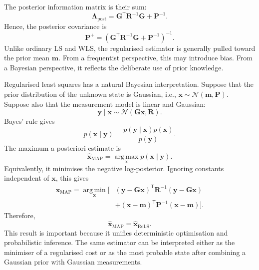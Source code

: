 The posterior information matrix is their sum:
\begin{equation}
\mathbf{\Lambda}_{\mathrm{post}}
=
\mathbf{G}^{\mathsf T}
\mathbf{R}^{-1}
\mathbf{G}
+
\mathbf{P}^{-1}.
\end{equation}
Hence, the posterior covariance is
\begin{equation}
\mathbf{P}^{+}
=
\left(
\mathbf{G}^{\mathsf T}
\mathbf{R}^{-1}
\mathbf{G}
+
\mathbf{P}^{-1}
\right)^{-1}.
\end{equation}
Unlike ordinary LS and WLS, the regularised estimator is generally pulled toward the prior mean $\mathbf{m}$. From a frequentist perspective, this may introduce bias. From a Bayesian perspective, it reflects the deliberate use of prior knowledge.

Regularised least squares has a natural Bayesian interpretation. Suppose that the prior distribution of the unknown state is Gaussian, i.e., $\mathbf{x}
\sim
\mathcal{N}
\left(
\mathbf{m},
\mathbf{P}
\right)$. Suppose also that the measurement model is linear and Gaussian:
\begin{equation}
\mathbf{y}\mid\mathbf{x}
\sim
\mathcal{N}
\left(
\mathbf{G}\mathbf{x},
\mathbf{R}
\right).
\end{equation}
Bayes' rule gives
\begin{equation}
p(\mathbf{x}\mid\mathbf{y})
=
\frac{
p(\mathbf{y}\mid\mathbf{x})p(\mathbf{x})
}{
p(\mathbf{y})
}.
\end{equation}
The maximum a posteriori estimate is
\begin{equation}
\widehat{\mathbf{x}}_{\mathrm{MAP}}
=
\operatorname*{arg\,max}_{\mathbf{x}}
p(\mathbf{x}\mid\mathbf{y}).
\end{equation}
Equivalently, it minimises the negative log-posterior. Ignoring constants independent of $\mathbf{x}$, this gives
\begin{align}
\widehat{\mathbf{x}}_{\mathrm{MAP}}
=
\operatorname*{arg\,min}_{\mathbf{x}}
\bigg[
&\left(
\mathbf{y}
-
\mathbf{G}\mathbf{x}
\right)^{\mathsf T}
\mathbf{R}^{-1}
\left(
\mathbf{y}
-
\mathbf{G}\mathbf{x}
\right) \nonumber \\
&+
\left(
\mathbf{x}
-
\mathbf{m}
\right)^{\mathsf T}
\mathbf{P}^{-1}
\left(
\mathbf{x}
-
\mathbf{m}
\right)
\bigg].
\end{align}
Therefore,
\begin{equation}
\widehat{\mathbf{x}}_{\mathrm{MAP}}
=
\widehat{\mathbf{x}}_{\mathrm{ReLS}}.
\end{equation}
This result is important because it unifies deterministic optimisation and probabilistic inference. The same estimator can be interpreted either as the minimiser of a regularised cost or as the most probable state after combining a Gaussian prior with Gaussian measurements.

